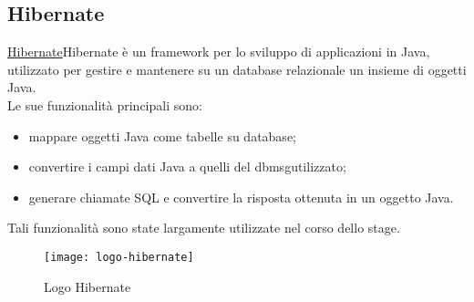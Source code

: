 \subsection{Hibernate}
\href{https://hibernate.org/}{Hibernate}Hibernate è un framework per lo sviluppo di applicazioni in Java, utilizzato per gestire e mantenere su un database relazionale un insieme di oggetti Java.
\\Le sue funzionalità principali sono:
\begin{itemize}
    \item mappare oggetti Java come tabelle su database;
    \item convertire i campi dati Java a quelli del \gls{dbmsg}\glsfirstoccur utilizzato;
    \item generare chiamate SQL e convertire la risposta ottenuta in un oggetto Java.
\end{itemize}
Tali funzionalità sono state largamente utilizzate nel corso dello stage.
\begin{figure}[h]
    \begin{center}
    \texttt{[image: logo-hibernate]}
    \caption{Logo Hibernate}
    \label{fig:figure5}
    \end{center}
\end{figure}

